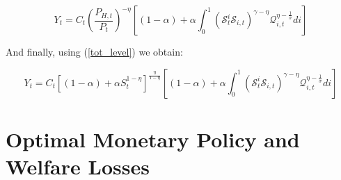 \documentclass{article}
\begin{document}
\begin{equation}
    Y_{t} = C_t \left( \frac{P_{H,t}}{P_t} \right)^{-\eta} \left[(1-\alpha)  +  \alpha \int_0^1 \left(\mathcal S^i_t \mathcal S_{i,t} \right)^{\gamma - \eta} \mathcal Q^{\eta - \frac{1}{\sigma}}_{i,t} di \right] 
\end{equation}

And finally, using (\ref{tot_level}) we obtain:

\begin{equation}
    Y_{t} = C_t \left[(1-\alpha) + \alpha S_t^{1-\eta} \right]^{\frac{\eta}{1-\eta}} \left[(1-\alpha)  +  \alpha \int_0^1 \left(\mathcal S^i_t \mathcal S_{i,t} \right)^{\gamma - \eta} \mathcal Q^{\eta - \frac{1}{\sigma}}_{i,t} di \right] 
\end{equation}

\section{Optimal Monetary Policy and Welfare Losses}
\end{document}
